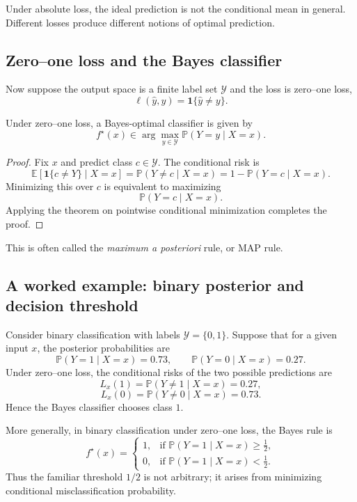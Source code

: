 Under absolute loss, the ideal prediction is not the conditional mean in general. Different losses produce different notions of optimal prediction.

\subsection*{Zero--one loss and the Bayes classifier}

Now suppose the output space is a finite label set $\mathcal Y$ and the loss is zero--one loss,
\[
\ell(\hat y,y)=\mathbf 1\{\hat y\neq y\}.
\]

\begin{proposition}
Under zero--one loss, a Bayes-optimal classifier is given by
\[
f^\star(x)\in \arg\max_{y\in\mathcal Y} \mathbb P(Y=y\mid X=x).
\]
\end{proposition}

\begin{proof}
Fix $x$ and predict class $c\in\mathcal Y$. The conditional risk is
\[
\mathbb E[\mathbf 1\{c\neq Y\}\mid X=x]
=
\mathbb P(Y\neq c\mid X=x)
=
1-\mathbb P(Y=c\mid X=x).
\]
Minimizing this over $c$ is equivalent to maximizing
\[
\mathbb P(Y=c\mid X=x).
\]
Applying the theorem on pointwise conditional minimization completes the proof.
\end{proof}

This is often called the \emph{maximum a posteriori} rule, or MAP rule.

\subsection*{A worked example: binary posterior and decision threshold}

Consider binary classification with labels $\mathcal Y=\{0,1\}$. Suppose that for a given input $x$, the posterior probabilities are
\[
\mathbb P(Y=1\mid X=x)=0.73,
\qquad
\mathbb P(Y=0\mid X=x)=0.27.
\]
Under zero--one loss, the conditional risks of the two possible predictions are
\[
L_x(1)=\mathbb P(Y\neq 1\mid X=x)=0.27,
\]
\[
L_x(0)=\mathbb P(Y\neq 0\mid X=x)=0.73.
\]
Hence the Bayes classifier chooses class $1$.

More generally, in binary classification under zero--one loss, the Bayes rule is
\[
f^\star(x)=
\begin{cases}
1, & \text{if } \mathbb P(Y=1\mid X=x)\ge \frac12,\\[4pt]
0, & \text{if } \mathbb P(Y=1\mid X=x)< \frac12.
\end{cases}
\]
Thus the familiar threshold $1/2$ is not arbitrary; it arises from minimizing conditional misclassification probability.

